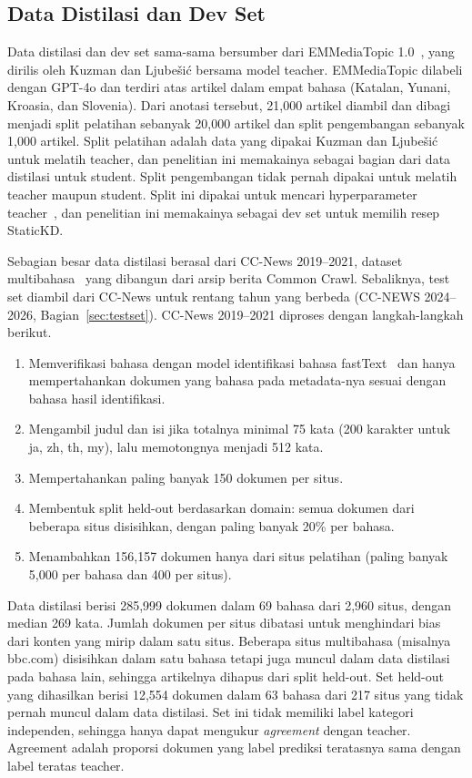 \documentclass[journal]{IEEEtran}
\begin{document}
\subsection{Data Distilasi dan Dev Set}
\label{sec:distdata}
Data distilasi dan dev set sama-sama bersumber dari EMMediaTopic 1.0~\cite{emmediatopic2025,kuzman2025llm}, yang dirilis oleh Kuzman dan Ljube\v{s}i\'c bersama model teacher. EMMediaTopic dilabeli dengan GPT-4o dan terdiri atas artikel dalam empat bahasa (Katalan, Yunani, Kroasia, dan Slovenia). Dari anotasi tersebut, 21,000 artikel diambil dan dibagi menjadi split pelatihan sebanyak 20,000 artikel dan split pengembangan sebanyak 1,000 artikel. Split pelatihan adalah data yang dipakai Kuzman dan Ljube\v{s}i\'c untuk melatih teacher, dan penelitian ini memakainya sebagai bagian dari data distilasi untuk student. Split pengembangan tidak pernah dipakai untuk melatih teacher maupun student. Split ini dipakai untuk mencari hyperparameter teacher~\cite{kuzman2025llm}, dan penelitian ini memakainya sebagai dev set untuk memilih resep StaticKD.

Sebagian besar data distilasi berasal dari CC-News 2019--2021, dataset multibahasa~\cite{cloversearch_ccnews} yang dibangun dari arsip berita Common Crawl. Sebaliknya, test set diambil dari CC-News untuk rentang tahun yang berbeda (CC-NEWS 2024--2026, Bagian~\ref{sec:testset}). CC-News 2019--2021 diproses dengan langkah-langkah berikut.
\begin{enumerate}
  \item Memverifikasi bahasa dengan model identifikasi bahasa fastText~\cite{joulin2017bag} dan hanya mempertahankan dokumen yang bahasa pada metadata-nya sesuai dengan bahasa hasil identifikasi.
  \item Mengambil judul dan isi jika totalnya minimal 75 kata (200 karakter untuk ja, zh, th, my), lalu memotongnya menjadi 512 kata.
  \item Mempertahankan paling banyak 150 dokumen per situs.
  \item Membentuk split held-out berdasarkan domain: semua dokumen dari beberapa situs disisihkan, dengan paling banyak 20\% per bahasa.
  \item Menambahkan 156,157 dokumen hanya dari situs pelatihan (paling banyak 5,000 per bahasa dan 400 per situs).
\end{enumerate}
Data distilasi berisi 285,999 dokumen dalam 69 bahasa dari 2,960 situs, dengan median 269 kata. Jumlah dokumen per situs dibatasi untuk menghindari bias dari konten yang mirip dalam satu situs. Beberapa situs multibahasa (misalnya bbc.com) disisihkan dalam satu bahasa tetapi juga muncul dalam data distilasi pada bahasa lain, sehingga artikelnya dihapus dari split held-out. Set held-out yang dihasilkan berisi 12,554 dokumen dalam 63 bahasa dari 217 situs yang tidak pernah muncul dalam data distilasi. Set ini tidak memiliki label kategori independen, sehingga hanya dapat mengukur \emph{agreement} dengan teacher. Agreement adalah proporsi dokumen yang label prediksi teratasnya sama dengan label teratas teacher.
\end{document}
